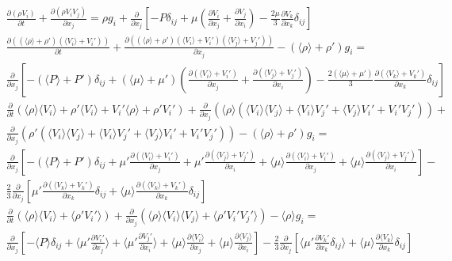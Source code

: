\documentclass[10pt]{article}
\newcommand{\beqa}{\begin{equation}\begin{aligned}}
\newcommand{\eeqa}{\end{aligned}\end{equation}}
\newcommand{\la}{\langle}
\newcommand{\ra}{\rangle}
\begin{document}
\begin{flushleft}
\beqa
\frac{\partial(\rho V_i)}{\partial t}+\frac{\partial(\rho V_iV_j)}{\partial x_j}= \rho g_i+\frac{\partial}{\partial x_j}\left\lbrack-P\delta_{ij}+\mu\left(\frac{\partial V_i}{\partial x_j}+\frac{\partial V_j}{\partial x_i}\right)-\frac{2\mu}{3}\frac{\partial V_k}{\partial x_k}\delta_{ij}\right\rbrack\\
\frac{\partial((\la\rho\ra+\rho') (\la V_i\ra+V_i'))}{\partial t}+\frac{\partial((\la\rho\ra+\rho') (\la V_i\ra+V_i')(\la V_j\ra+V_j'))}{\partial x_j}-(\la\rho\ra+\rho') g_i= \quad\quad\\
\frac{\partial}{\partial x_j}\left\lbrack-(\la P\ra+P')\delta_{ij}+(\la\mu\ra+\mu')\left(\frac{\partial (\la V_i\ra+V_i')}{\partial x_j}+\frac{\partial (\la V_j\ra+V_j')}{\partial x_i}\right)-\frac{2(\la\mu\ra+\mu')}{3}\frac{\partial (\la V_k\ra+V_k')}{\partial x_k}\delta_{ij}\right\rbrack\\
\frac{\partial}{\partial t}\left(\la \rho\ra\la V_i\ra+\rho'\la V_i\ra+V_i'\la\rho\ra+\rho' V_i'\right)+\frac{\partial}{\partial x_j}\left(\la\rho\ra(\la V_i\ra\la V_j\ra+\la V_i\ra V_j'+\la V_j\ra V_i'+V_i'V_j')\right)+\\
\frac{\partial}{\partial x_j}\left(\rho'(\la V_i\ra\la V_j\ra+\la V_i\ra V_j'+\la V_j\ra V_i'+V_i'V_j')\right)-(\la\rho\ra +\rho')g_i= \quad\quad\\
\frac{\partial}{\partial x_j}\left\lbrack-(\la P\ra+P')\delta_{ij}+\mu'\frac{\partial (\la V_i\ra+V_i')}{\partial x_j}+\mu'\frac{\partial (\la V_j\ra+V_j')}{\partial x_i}+\la\mu\ra\frac{\partial (\la V_i\ra+V_i')}{\partial x_j}+\la\mu\ra\frac{\partial (\la V_j\ra+V_j')}{\partial x_i}\right\rbrack-\\
\frac{2}{3}\frac{\partial}{\partial x_j}\left\lbrack\mu'\frac{\partial (\la V_k\ra+V_k')}{\partial x_k}\delta_{ij}+\la\mu\ra\frac{\partial (\la V_k\ra+V_k')}{\partial x_k}\delta_{ij}\right\rbrack\\
\frac{\partial}{\partial t}\left(\la \rho\ra\la V_i\ra+\la\rho' V_i'\ra\right)+\frac{\partial}{\partial x_j}\left(\la\rho\ra\la V_i\ra\la V_j\ra+\la\rho'V_i'V_j'\ra\right)-\la\rho\ra g_i= \quad\quad\\
\frac{\partial}{\partial x_j}\left\lbrack-\la P\ra\delta_{ij}+\la\mu'\frac{\partial V_i'}{\partial x_j}\ra+\la\mu'\frac{\partial V_j'}{\partial x_i}\ra+\la\mu\ra\frac{\partial \la V_i\ra}{\partial x_j}+\la\mu\ra\frac{\partial \la V_j\ra}{\partial x_i}\right\rbrack-\frac{2}{3}\frac{\partial}{\partial x_j}\left\lbrack\la\mu'\frac{\partial V_k'}{\partial x_k}\delta_{ij}\ra+\la\mu\ra\frac{\partial \la V_k\ra}{\partial x_k}\delta_{ij}\right\rbrack
\eeqa


\end{flushleft}
\end{document}
